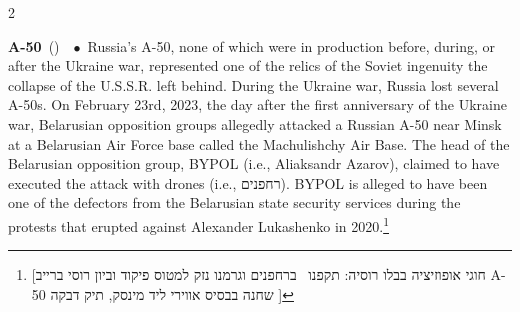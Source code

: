 \documentclass[10pt,a4paper,twoside]{article} %
\newcommand{\entry}[4]{\markboth{#1}{#1}\textbf{#1}\ {(#2)}\ \textit{#3}\ $\bullet$\ {#4}}  %
\begin{document}
\begin{multicols}{2}

\entry{A-50} {} {} {Russia's A-50, none of which were in production before, during, or after the Ukraine war, represented one of the relics of the Soviet ingenuity the collapse of the U.S.S.R. left behind. During the Ukraine war, Russia lost several A-50s. On February 23rd, 2023, the day after the first anniversary of the Ukraine war, Belarusian opposition groups allegedly attacked a Russian A-50 near Minsk at a Belarusian Air Force base called the Machulishchy Air Base. The head of the Belarusian opposition group, BYPOL (i.e., Aliaksandr Azarov), claimed to have executed the attack with drones (i.e., \texthebrew{רחפנים}). BYPOL is alleged to have been one of the defectors from the Belarusian state security services during the protests that erupted against Alexander Lukashenko in 2020.\footnote{[\texthebrew{חוגי אופוזיציה בבלו רוסיה: תקפנו  ברחפנים וגרמנו נזק למטוס פיקוד וביון רוסי ברייב A-50 שחנה בבסיס אווירי ליד מינסק, תיק דבקה
}]}} 


\end{multicols}
\end{document}
